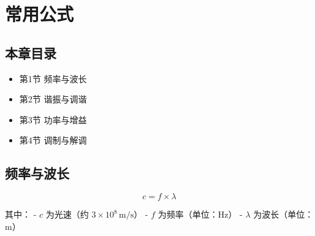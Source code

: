 
\chapter{常用公式}
\label{chap:formulas}

\section{本章目录}
\begin{itemize}
    \item 第1节 频率与波长
    \item 第2节 谐振与调谐
    \item 第3节 功率与增益
    \item 第4节 调制与解调
\end{itemize}

\section{频率与波长}

\begin{equation}
    c = f \times \lambda
    \label{eq:wave_speed}
\end{equation}

其中：
- \( c \) 为光速（约 \( 3 \times 10^8 \, \text{m/s} \)）
- \( f \) 为频率（单位：Hz）
- \( \lambda \) 为波长（单位：m）


